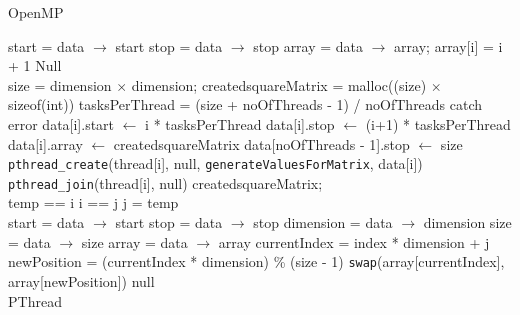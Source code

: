 \documentclass[10pt,twocolumn]{witseiepaper}
\begin{document}
\begin{appendix}
\begin{algorithm}[htbp]
\begin{algorithmic}
		\caption{OpenMP}
		\label{alg:1}
	\end{algorithmic}
\end{algorithm}

\begin{algorithm}[htbp]
	\begin{algorithmic}
		\State start = data $\rightarrow$ start
		\State stop = data $\rightarrow$ stop
		\State array = data $\rightarrow$ array;
		\State array[i] = i + 1
		\EndFor
		\State \Return Null
		\EndFunction \\
		
		\State size = dimension $\times$ dimension;
		\State created\textunderscore squareMatrix = malloc((size) $\times$ sizeof(int))
		\State tasksPerThread = (size + noOfThreads - 1) / noOfThreads
		\State catch error
		\EndIf
		\State data[i].start $\leftarrow$ i * tasksPerThread
		\State data[i].stop $\leftarrow$ (i+1) * tasksPerThread
		\State data[i].array $\leftarrow$ created\textunderscore squareMatrix
		\EndFor
		\State data[noOfThreads - 1].stop $\leftarrow$ size
		\State  \verb|pthread_create|(thread[i], null, \verb|generateValuesForMatrix|, data[i])
		\EndFor
		\State  \verb|pthread_join|(thread[i], null)
		\EndFor
		\EndFunction
		\State \Return created\textunderscore squareMatrix; \\
		
		\State temp == i
		\State i == j
		\State j = temp
		\EndFunction \\
		
		\State start = data $\rightarrow$ start
		\State stop = data $\rightarrow$ stop
		\State dimension = data $\rightarrow$ dimension
		\State size = data $\rightarrow$ size
		\State array = data $\rightarrow$ array
		\State currentIndex = index * dimension + j
		\State newPosition = (currentIndex * dimension) \% (size - 1)
		\State \verb|swap|(array[currentIndex], array[newPosition])
		\EndFor
		\EndFor
		\State \Return null
		\EndFunction \\
		
		\caption{PThread}
		\label{alg:3}
	\end{algorithmic}
\end{algorithm}


\end{appendix}
\end{document}
